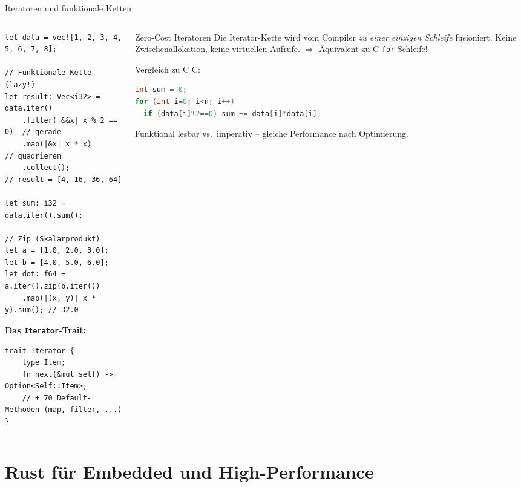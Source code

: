 \documentclass[%
  aspectratio=169,
  10pt
]{beamer}
\begin{document}
\begin{frame}[fragile]{Iteratoren und funktionale Ketten}
  \begin{columns}[T]
    \begin{column}{0.50\textwidth}
\begin{lstlisting}
let data = vec![1, 2, 3, 4, 5, 6, 7, 8];

// Funktionale Kette (lazy!)
let result: Vec<i32> = data.iter()
    .filter(|&&x| x % 2 == 0)  // gerade
    .map(|&x| x * x)           // quadrieren
    .collect();
// result = [4, 16, 36, 64]

let sum: i32 = data.iter().sum();

// Zip (Skalarprodukt)
let a = [1.0, 2.0, 3.0];
let b = [4.0, 5.0, 6.0];
let dot: f64 = a.iter().zip(b.iter())
    .map(|(x, y)| x * y).sum(); // 32.0
\end{lstlisting}
      \textbf{Das \texttt{Iterator}-Trait:}
\begin{lstlisting}
trait Iterator {
    type Item;
    fn next(&mut self) -> Option<Self::Item>;
    // + 70 Default-Methoden (map, filter, ...)
}
\end{lstlisting}
    \end{column}
    \begin{column}{0.47\textwidth}
      \begin{block}{Zero-Cost Iteratoren}
        \small Die Iterator-Kette wird vom Compiler
        \emph{zu einer einzigen Schleife} fusioniert.
        Keine Zwischenallokation, keine virtuellen Aufrufe.
        $\Rightarrow$ Äquivalent zu C \texttt{for}-Schleife!
      \end{block}
      \begin{alertblock}{Vergleich zu C}
        \small C:
\begin{lstlisting}[language=C,numbers=none,frame=none,backgroundcolor=\color{blackberry!8}]
int sum = 0;
for (int i=0; i<n; i++)
  if (data[i]%2==0) sum += data[i]*data[i];
\end{lstlisting}
        Funktional lesbar vs.\ imperativ --
        gleiche Performance nach Optimierung.
      \end{alertblock}
    \end{column}
  \end{columns}
\end{frame}

\section{Rust für Embedded und High-Performance}
\end{document}
